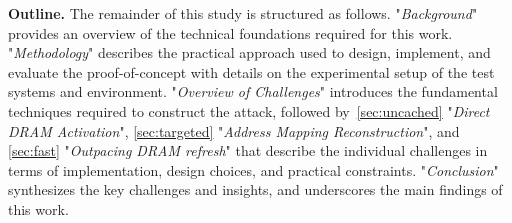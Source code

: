   \noindent
  \textbf{Outline.} The remainder of this study is structured as follows.
   "\textit{Background}" provides an overview of the technical foundations required for this work.
   "\textit{Methodology}" describes the practical approach used to design, implement, and evaluate the proof-of-concept with details on the experimental setup of the test systems and environment.
   "\textit{Overview of Challenges}" introduces the fundamental techniques required to construct the attack, 
  followed by~\cref{sec:uncached} "\textit{Direct DRAM Activation}", \cref{sec:targeted} "\textit{Address Mapping Reconstruction}", and \cref{sec:fast} "\textit{Outpacing DRAM refresh}" that describe the individual challenges in terms of implementation, design choices, and practical constraints. 
   "\textit{Conclusion}" synthesizes the key challenges and insights, and underscores the main findings of this work.
